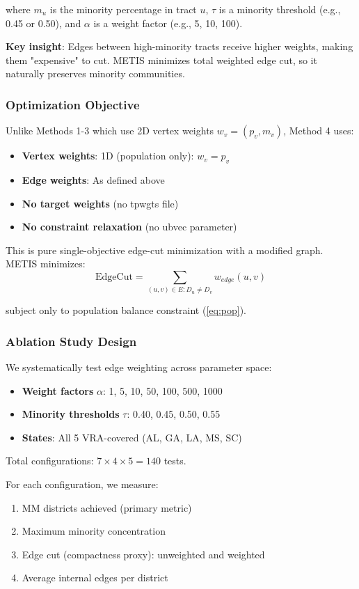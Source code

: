 where $m_u$ is the minority percentage in tract $u$, $\tau$ is a minority threshold (e.g., 0.45 or 0.50), and $\alpha$ is a weight factor (e.g., 5, 10, 100).

\textbf{Key insight}: Edges between high-minority tracts receive higher weights, making them "expensive" to cut. METIS minimizes total weighted edge cut, so it naturally preserves minority communities.

\subsubsection{Optimization Objective}

Unlike Methods 1-3 which use 2D vertex weights $w_v = (p_v, m_v)$, Method 4 uses:
\begin{itemize}
\item \textbf{Vertex weights}: 1D (population only): $w_v = p_v$
\item \textbf{Edge weights}: As defined above
\item \textbf{No target weights} (no tpwgts file)
\item \textbf{No constraint relaxation} (no ubvec parameter)
\end{itemize}

This is pure single-objective edge-cut minimization with a modified graph. METIS minimizes:
\begin{equation}
\text{EdgeCut} = \sum_{(u,v) \in E : D_u \neq D_v} w_{edge}(u, v)
\end{equation}

subject only to population balance constraint (\ref{eq:pop}).

\subsubsection{Ablation Study Design}

We systematically test edge weighting across parameter space:
\begin{itemize}
\item \textbf{Weight factors} $\alpha$: 1, 5, 10, 50, 100, 500, 1000
\item \textbf{Minority thresholds} $\tau$: 0.40, 0.45, 0.50, 0.55
\item \textbf{States}: All 5 VRA-covered (AL, GA, LA, MS, SC)
\end{itemize}

Total configurations: $7 \times 4 \times 5 = 140$ tests.

For each configuration, we measure:
\begin{enumerate}
\item MM districts achieved (primary metric)
\item Maximum minority concentration
\item Edge cut (compactness proxy): unweighted and weighted
\item Average internal edges per district
\end{enumerate}

